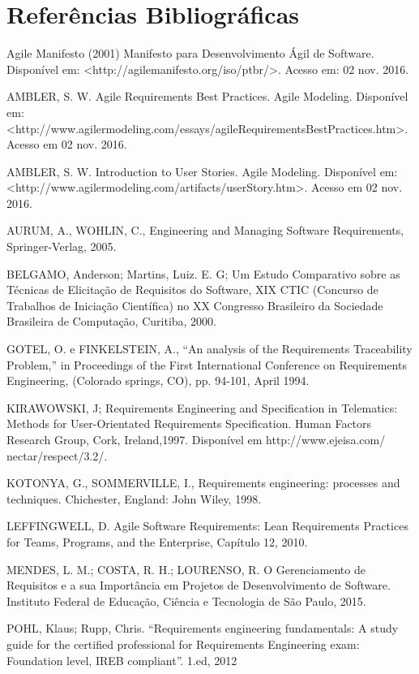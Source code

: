 \chapter[Referências Bibliográficas]{Referências Bibliográficas}

Agile Manifesto (2001) Manifesto para Desenvolvimento Ágil de Software. Disponível em: <http://agilemanifesto.org/iso/ptbr/>. Acesso em: 02 nov. 2016.

AMBLER, S. W. Agile Requirements Best Practices. Agile Modeling. Disponível em: <http://www.agilermodeling.com/essays/agileRequirementsBestPractices.htm>. Acesso em 02 nov. 2016.

AMBLER, S. W. Introduction to User Stories. Agile Modeling. Disponível em: <http://www.agilermodeling.com/artifacts/userStory.htm>. Acesso em 02 nov. 2016.

AURUM, A., WOHLIN, C., Engineering and Managing Software Requirements, Springer-Verlag, 2005. 

BELGAMO, Anderson; Martins, Luiz. E. G; Um Estudo Comparativo sobre as Técnicas de Elicitação de Requisitos do Software, XIX CTIC (Concurso de Trabalhos de Iniciação Científica) no XX Congresso Brasileiro da Sociedade Brasileira de Computação, Curitiba, 2000.

GOTEL, O. e FINKELSTEIN, A., “An analysis of the Requirements Traceability Problem,” in Proceedings of the First International Conference on Requirements Engineering, (Colorado springs, CO), pp. 94-101, April 1994.

KIRAWOWSKI, J; Requirements Engineering and Specification in Telematics: Methods for User-Orientated Requirements Specification. Human Factors Research Group, Cork, Ireland,1997. Disponível em http://www.ejeisa.com/ nectar/respect/3.2/.

KOTONYA, G., SOMMERVILLE, I., Requirements engineering: processes and
techniques. Chichester, England: John Wiley, 1998. 

LEFFINGWELL, D. Agile Software Requirements: Lean Requirements Practices for Teams, Programs, and the Enterprise, Capítulo 12, 2010.

MENDES, L. M.; COSTA, R. H.; LOURENSO, R. O Gerenciamento de Requisitos e a sua Importância em Projetos de Desenvolvimento de Software. Instituto Federal de Educação, Ciência e Tecnologia de São Paulo, 2015.

POHL, Klaus; Rupp, Chris. “Requirements engineering fundamentals: A study guide for the certified professional for Requirements Engineering exam: Foundation level, IREB compliant”. 1.ed, 2012

